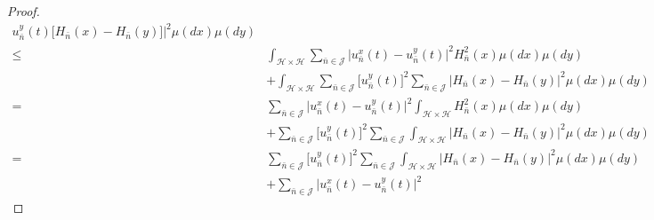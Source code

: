 \documentclass[]{interact}
\theoremstyle{plain}%
\theoremstyle{definition}
\theoremstyle{remark}
\begin{document}
\begin{proof}
\begin{equation}
\begin{aligned}
                            u_{\bar n}^y(t)
                            \big[
                                H_{\bar n}(x) - H_{\bar n}(y)
                            \big]
                    \Big|^2
                    \mu(dx) \mu(dy)
                    \\
                    \le&
                    \int_{\mathcal{H} \times \mathcal{H}}
                    \sum_{\bar n\in \mathcal{J}}
                    \big|
                        u_{\bar n}^x(t) - u_{\bar n}^y(t)
                    \big |^2
                    H_{\bar n}^2(x)
                    \mu(dx) \mu(dy)
                    \\
                    &+
                    \int_{\mathcal{H}\times \mathcal{H}}
                    \sum_{\bar n\in \mathcal{J}}
                    \big[u_{\bar n} ^ y(t) \big]^2
                    \sum_{\bar n\in \mathcal{J}}
                    \big|
                        H_{\bar n}(x) - H_{\bar n}(y)
                    \big|^2
                    \mu(dx) \mu(dy)
                    \\
                    =&
                    \sum_{\bar n\in \mathcal{J}}
                    \big|
                        u_{\bar n}^x(t)-u_{\bar n}^y(t)
                    \big |^2
                    \int_{\mathcal{H} \times \mathcal{H}}
                    H_{\bar n}^2 (x)
                    \mu(dx) \mu(dy)
                    \\
                    &+
                    \sum_{\bar n\in \mathcal{J}}
                    \big[
                        u_{\bar n}^y(t)
                    \big] ^ 2
                    \sum_{\bar n\in \mathcal{J}}
                    \int_{\mathcal{H}\times \mathcal{H}}
                    \big|
                        H_{\bar n}(x) - H_{\bar n}(y)
                    \big| ^ 2 \mu(dx)\mu(dy)
                    \\
                    =&
                    \sum_{\bar n\in \mathcal{J}}
                    \big[
                        u_{\bar n}^y(t)
                    \big] ^ 2
                    \sum_{\bar n\in \mathcal{J}}
                    \int_{\mathcal{H}\times \mathcal{H}}
                    \big|
                        H_{\bar n}(x) -H_{\bar n}(y)
                    \big|^2 \mu(dx) \mu(dy)
                    \\
                    &+
                    \sum_{\bar n\in \mathcal{J}}
                                \big|
                                    u_{\bar n}^x(t)-u_{\bar n}^y(t)
                                \big| ^ 2

\end{aligned}
\end{equation}
\end{proof}
\end{document}
